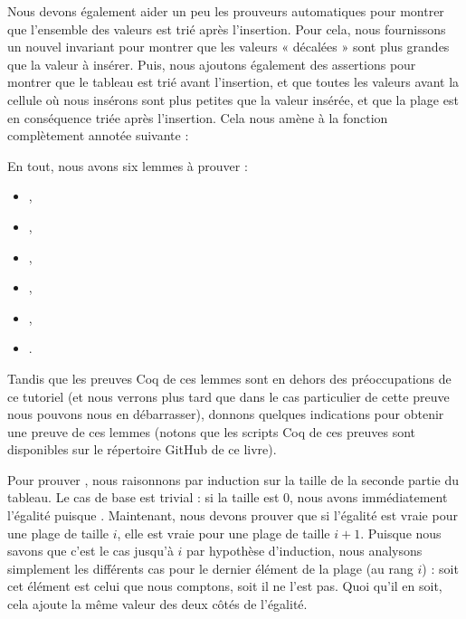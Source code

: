 

Nous devons également aider un peu les prouveurs automatiques pour montrer
que l'ensemble des valeurs est trié après l'insertion. Pour cela, nous fournissons
un nouvel invariant pour montrer que les valeurs « décalées » sont plus grandes
que la valeur à insérer. Puis, nous ajoutons également des assertions pour
montrer que le tableau est trié avant l'insertion, et que toutes les valeurs
avant la cellule où nous insérons sont plus petites que la valeur insérée, et
que la plage est en conséquence triée après l'insertion. Cela nous amène à
la fonction  complètement annotée suivante :






En tout, nous avons six lemmes à prouver :
\begin{itemize}
\item {},
\item {},
\item {},
\item {},
\item {},
\item {}.
\end{itemize}


Tandis que les preuves Coq de ces lemmes sont en dehors des préoccupations de ce
tutoriel (et nous verrons plus tard que dans le cas particulier de cette preuve
nous pouvons nous en débarrasser), donnons quelques indications pour obtenir une
preuve de ces lemmes (notons que les scripts Coq de ces preuves sont disponibles
sur le répertoire GitHub de ce livre).


Pour prouver , nous raisonnons par induction
sur la taille de la seconde partie du tableau. Le cas de base est trivial : si
la taille est 0, nous avons immédiatement l'égalité puisque .
Maintenant, nous devons prouver que si l'égalité est vraie pour une plage de taille
$i$, elle est vraie pour une plage de taille $i+1$. Puisque nous savons que c'est
le cas jusqu'à $i$ par hypothèse d'induction, nous analysons simplement les
différents cas pour le dernier élément de la plage (au rang $i$) : soit cet élément
est celui que nous comptons, soit il ne l'est pas. Quoi qu'il en soit, cela ajoute
la même valeur des deux côtés de l'égalité.


